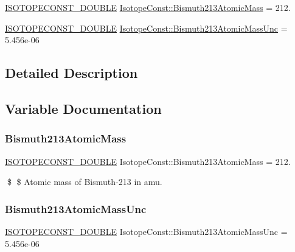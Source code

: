 \begin{DoxyCompactItemize}
\item 
\mbox{\hyperlink{group___isotope_const-_macros_ga8f45a7272ce02c0b4c65c44636ed719a}{I\+S\+O\+T\+O\+P\+E\+C\+O\+N\+S\+T\+\_\+\+D\+O\+U\+B\+LE}} \mbox{\hyperlink{group___isotope_const-_bismuth-_bi213_gad90abd6de5d972de76f9584912137657}{Isotope\+Const\+::\+Bismuth213\+Atomic\+Mass}} = 212.
\item 
\mbox{\hyperlink{group___isotope_const-_macros_ga8f45a7272ce02c0b4c65c44636ed719a}{I\+S\+O\+T\+O\+P\+E\+C\+O\+N\+S\+T\+\_\+\+D\+O\+U\+B\+LE}} \mbox{\hyperlink{group___isotope_const-_bismuth-_bi213_ga5d4e38b04fa91ccec76cb1c4db1262e4}{Isotope\+Const\+::\+Bismuth213\+Atomic\+Mass\+Unc}} = 5.\+456e-\/06
\end{DoxyCompactItemize}


\subsection{Detailed Description}


\subsection{Variable Documentation}
\mbox{\label{group___isotope_const-_bismuth-_bi213_gad90abd6de5d972de76f9584912137657}} 
\subsubsection{\texorpdfstring{Bismuth213\+Atomic\+Mass}{Bismuth213AtomicMass}}
{\footnotesize\ttfamily \mbox{\hyperlink{group___isotope_const-_macros_ga8f45a7272ce02c0b4c65c44636ed719a}{I\+S\+O\+T\+O\+P\+E\+C\+O\+N\+S\+T\+\_\+\+D\+O\+U\+B\+LE}} Isotope\+Const\+::\+Bismuth213\+Atomic\+Mass = 212.}

\$ \$ Atomic mass of Bismuth-\/213 in amu. \mbox{\label{group___isotope_const-_bismuth-_bi213_ga5d4e38b04fa91ccec76cb1c4db1262e4}} 
\subsubsection{\texorpdfstring{Bismuth213\+Atomic\+Mass\+Unc}{Bismuth213AtomicMassUnc}}
{\footnotesize\ttfamily \mbox{\hyperlink{group___isotope_const-_macros_ga8f45a7272ce02c0b4c65c44636ed719a}{I\+S\+O\+T\+O\+P\+E\+C\+O\+N\+S\+T\+\_\+\+D\+O\+U\+B\+LE}} Isotope\+Const\+::\+Bismuth213\+Atomic\+Mass\+Unc = 5.\+456e-\/06}

